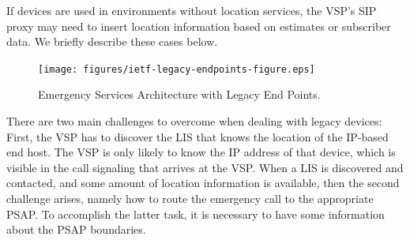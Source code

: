 \documentclass[12pt]{article}
\begin{document}
If devices are used in environments without location services, the VSP's SIP proxy may need to insert location information based on estimates or subscriber data. We briefly describe these cases below.

\begin{figure}[!t]
 \centering
 \texttt{[image: figures/ietf-legacy-endpoints-figure.eps]}
 \caption{Emergency Services Architecture with Legacy End Points.}
 \label{ietf-legacy-endpoints-figure}
\end{figure}

There are two main challenges to overcome when dealing with legacy devices: First, the VSP has to discover the LIS that knows the location of the IP-based end host. The VSP is only likely to know the IP address of that device, which is visible in the call signaling that arrives at the VSP. When a LIS is discovered and contacted, and some amount of location information is available, then the second challenge arises, namely how to route the emergency call to the appropriate PSAP. To accomplish the latter task, it is necessary to have some information about the PSAP boundaries. 
\end{document}
